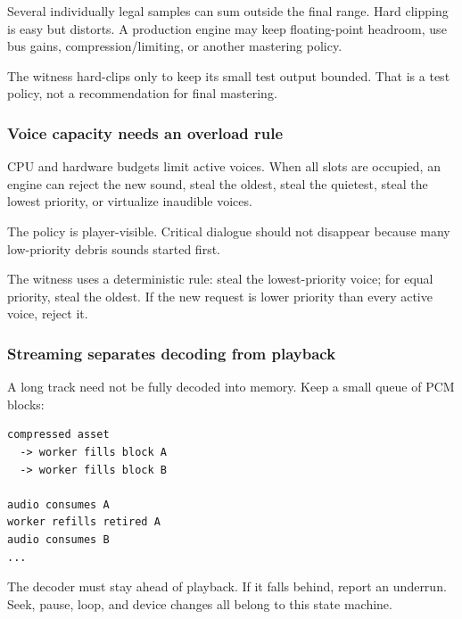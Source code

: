 Several individually legal samples can sum outside the final range. Hard clipping is easy but distorts. A production engine may keep floating-point headroom, use bus gains, compression/limiting, or another mastering policy.

The witness hard-clips only to keep its small test output bounded. That is a test policy, not a recommendation for final mastering.

\subsubsection{Voice capacity needs an overload rule}\label{05-engine-i-ch009-voice-capacity-needs-an-overload-rule}

\hypertarget{05-engine-i-ch009-voice-capacity-needs-an-overload-rule}{}

CPU and hardware budgets limit active voices. When all slots are occupied, an engine can reject the new sound, steal the oldest, steal the quietest, steal the lowest priority, or virtualize inaudible voices.

The policy is player-visible. Critical dialogue should not disappear because many low-priority debris sounds started first.

The witness uses a deterministic rule: steal the lowest-priority voice; for equal priority, steal the oldest. If the new request is lower priority than every active voice, reject it.

\subsubsection{Streaming separates decoding from playback}\label{05-engine-i-ch009-streaming-separates-decoding-from-playback}

\hypertarget{05-engine-i-ch009-streaming-separates-decoding-from-playback}{}

A long track need not be fully decoded into memory. Keep a small queue of PCM blocks:

\begin{verbatim}
compressed asset
  -> worker fills block A
  -> worker fills block B

audio consumes A
worker refills retired A
audio consumes B
...
\end{verbatim}

The decoder must stay ahead of playback. If it falls behind, report an underrun. Seek, pause, loop, and device changes all belong to this state machine.

